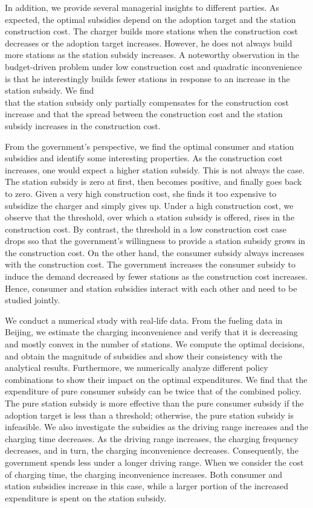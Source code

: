 \documentclass[10pt]{article}
\begin{document}
In addition, we provide several managerial insights to different parties. As expected, the optimal subsidies depend on the adoption target and the station construction cost. The charger builds more stations when the construction cost decreases or the adoption target increases. However, he does not always build more stations as the station subsidy increases. A noteworthy observation in the budget-driven problem under low construction cost and quadratic inconvenience is that he interestingly builds fewer stations in response to an increase in the station subsidy. We find\\
that the station subsidy only partially compensates for the construction cost increase and that the spread between the construction cost and the station subsidy increases in the construction cost.

From the government's perspective, we find the optimal consumer and station subsidies and identify some interesting properties. As the construction cost increases, one would expect a higher station subsidy. This is not always the case. The station subsidy is zero at first, then becomes positive, and finally goes back to zero. Given a very high construction cost, she finds it too expensive to subsidize the charger and simply gives up. Under a high construction cost, we observe that the threshold, over which a station subsidy is offered, rises in the construction cost. By contrast, the threshold in a low construction cost case drops sso that the government's willingness to provide a station subsidy grows in the construction cost. On the other hand, the consumer subsidy always increases with the construction cost. The government increases the consumer subsidy to induce the demand decreased by fewer stations as the construction cost increases. Hence, consumer and station subsidies interact with each other and need to be studied jointly.

We conduct a numerical study with real-life data. From the fueling data in Beijing, we estimate the charging inconvenience and verify that it is decreasing and mostly convex in the number of stations. We compute the optimal decisions, and obtain the magnitude of subsidies and show their consistency with the analytical results. Furthermore, we numerically analyze different policy combinations to show their impact on the optimal expenditures. We find that the expenditure of pure consumer subsidy can be twice that of the combined policy. The pure station subsidy is more effective than the pure consumer subsidy if the adoption target is less than a threshold; otherwise, the pure station subsidy is infeasible. We also investigate the subsidies as the driving range increases and the charging time decreases. As the driving range increases, the charging frequency decreases, and in turn, the charging inconvenience decreases. Consequently, the government spends less under a longer driving range. When we consider the cost of charging time, the charging inconvenience increases. Both consumer and station subsidies increase in this case, while a larger portion of the increased expenditure is spent on the station subsidy.
\end{document}
